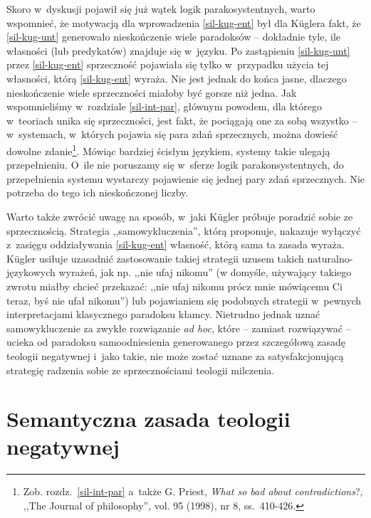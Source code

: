 Skoro w~dyskusji pojawił się już wątek logik parakosystentnych, warto wspomnieć, że motywacją dla wprowadzenia \ref{sil-kug-ent} był dla Küglera fakt, że \ref{sil-kug-unt} generowało nieskończenie wiele paradoksów -- dokładnie tyle, ile własności (lub predykatów) znajduje się w~języku. Po zastąpieniu \ref{sil-kug-unt} przez \ref{sil-kug-ent} sprzeczność pojawiała się tylko w~przypadku użycia tej własności, którą \ref{sil-kug-ent} wyraża. Nie jest jednak do końca jasne, dlaczego nieskończenie wiele sprzeczności miałoby być gorsze niż jedna. Jak wspomnieliśmy w~rozdziale \ref{sil-int-par}, głównym powodem, dla którego w~teoriach unika się sprzeczności, jest fakt, że pociągają one za sobą wszystko -- w~systemach, w~których pojawia się para zdań sprzecznych, można dowieść dowolne zdanie\footnote{Zob. rozdz.~\ref{sil-int-par} a~także G. Priest, \textit{What so bad about contradictions}?, ,,The Journal of philosophy'', vol. 95 (1998), nr 8, ss.~410-426.}. Mówiąc bardziej ścisłym językiem, systemy takie ulegają przepełnieniu. O~ile nie poruszamy się w~sferze logik parakonsystentnych, do przepełnienia systemu wystarczy pojawienie się jednej pary zdań sprzecznych. Nie potrzeba do tego ich nieskończonej liczby.

Warto także zwrócić uwagę na sposób, w~jaki Kügler próbuje poradzić sobie ze sprzecznością. Strategia ,,samowykluczenia'', którą proponuje, nakazuje wyłączyć z~zasięgu oddziaływania \ref{sil-kug-ent} własność, którą sama ta zasada wyraża. Kügler usiłuje uzasadnić zastosowanie takiej strategii uzusem takich naturalno-językowych wyrażeń, jak np. ,,nie ufaj nikomu'' (w domyśle, używający takiego zwrotu miałby chcieć przekazać: ,,nie ufaj nikomu prócz mnie mówiącemu Ci teraz, byś nie ufał nikomu'') lub pojawianiem się podobnych strategii w~pewnych interpretacjami klasycznego paradoksu kłamcy. Nietrudno jednak uznać samowykluczenie za zwykłe rozwiązanie \textit{ad hoc}, które -- zamiast rozwiązywać -- ucieka od paradoksu samoodniesienia generowanego przez szczegółową zasadę teologii negatywnej i~jako takie, nie może zostać uznane za satysfakcjonującą strategię radzenia sobie ze sprzecznościami teologii milczenia.


\chapter{Semantyczna zasada teologii negatywnej}\label{sil-gell}

